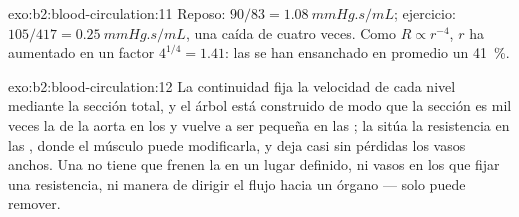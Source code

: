\begin{solution}{exo:b2:blood-circulation:11}
Reposo: $90/83 = \qty{1.08}{mmHg.s/mL}$; ejercicio: $105/417 =
\qty{0.25}{mmHg.s/mL}$, una caída de cuatro veces. Como $R \propto r^{-4}$,
$r$ ha aumentado en un factor $4^{1/4} = 1.41$: las  se han
ensanchado en promedio un \qty{41}{\%}.
\end{solution}

\begin{solution}{exo:b2:blood-circulation:12}
La continuidad fija la velocidad de cada nivel mediante la sección total,
y el árbol está construido de modo que la sección es mil veces la de la
aorta en los  y vuelve a ser pequeña en las ; la  sitúa la resistencia en las , donde el músculo puede
modificarla, y deja casi sin pérdidas los vasos anchos. Una  no tiene  que frenen la  en un lugar definido, ni
vasos en los que fijar una resistencia, ni manera de dirigir el flujo
hacia un órgano --- solo puede remover.
\end{solution}

